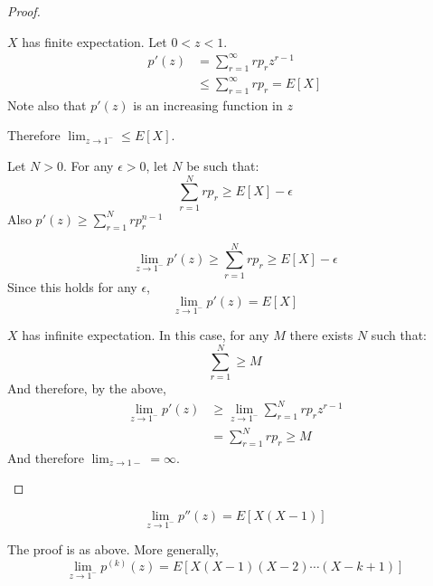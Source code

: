 \documentclass[../Main.tex]{subfiles}
\begin{document}
\begin{proof}
    \begin{case}{$X$ has finite expectation.}
        Let $0 < z < 1$.
        \begin{align*}
            p'(z) &= \sum_{r=1}^\infty r p_r z^{r-1} \\
            &\leq \sum_{r=1}^\infty rp_r = E[X]
        \end{align*}
        Note also that $p'(z)$ is an increasing function in $z$\par
        Therefore $\lim_{z \to 1^-} \leq E[X]$.\par
        Let $N > 0$. For any $\epsilon > 0$, let $N$ be such that:
        \begin{equation*}
            \sum_{r=1}^N rp_r \geq E[X] - \epsilon
        \end{equation*}
        Also $p'(z) \geq \sum_{r=1}^N rp_r ^{n-1}$\par
        \begin{equation*}
            \lim_{z \to 1^-} p'(z) \geq \sum_{r=1}^N rp_r \geq E[X] - \epsilon
        \end{equation*}
        Since this holds for any $\epsilon$,
        \begin{equation*}
            \lim_{z \to 1^-} p'(z) = E[X]
        \end{equation*}
    \end{case}
    \begin{case}{$X$ has infinite expectation.}
        In this case, for any $M$ there exists $N$ such that:
        \begin{equation*}
            \sum_{r=1}^N \geq M
        \end{equation*}
        And therefore, by the above,
        \begin{align*}
            \lim_{z \to 1^-} p'(z) &\geq \lim_{z \to 1^-} \sum_{r=1}^N rp_r z^{r-1} \\
            &=\sum_{r=1}^N rp_r \geq M 
        \end{align*}
        And therefore $\lim_{z \to 1-} = \infty$.
    \end{case}
\end{proof}
\begin{theorem}
    \begin{equation*}
        \lim_{z \to 1^-} p''(z) = E[X(X-1)]
    \end{equation*}
\end{theorem}
The proof is as above. More generally,
\begin{equation}
    \lim_{z \to 1^-} p^{(k)}(z) = E[X(X-1)(X-2) \cdots(X-k+1)]
    \label{eqnPGFDerivative}
\end{equation}
\end{document}
